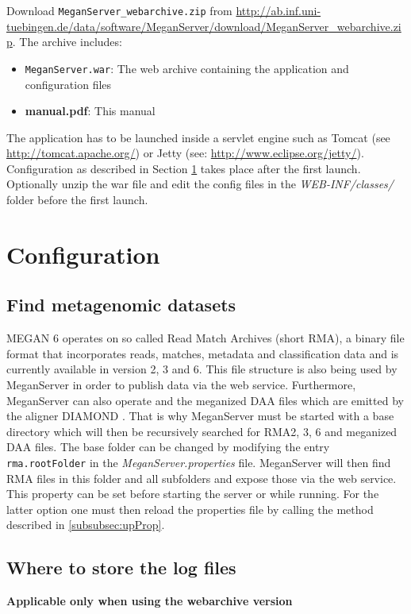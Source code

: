\documentclass[11pt]{article}
\begin{document}
Download \texttt{MeganServer\_webarchive.zip} from \url{http://ab.inf.uni-tuebingen.de/data/software/MeganServer/download/MeganServer\_webarchive.zip}. The archive includes:

\begin{itemize}
\item \texttt{MeganServer.war}: The web archive containing the application and configuration files
\item \textbf{manual.pdf}: This manual
\end{itemize}


The application has to be launched inside a servlet engine such as Tomcat (see \url{http://tomcat.apache.org/}) or Jetty (see: \url{http://www.eclipse.org/jetty/}). Configuration as described in Section \ref{sec:config} takes place after the first launch. Optionally unzip the war file and edit the config files in the \textit{WEB-INF/classes/} folder before the first launch.

\section{Configuration}
\label{sec:config}

\subsection{Find metagenomic datasets}
\label{subsec:props}

MEGAN 6 operates on so called Read Match Archives (short RMA), a binary file format that incorporates reads, matches, metadata and classification data and is currently available in version 2, 3 and 6. This file structure is also being used by MeganServer in order to publish data via the web service. Furthermore, MeganServer can also operate and the meganized DAA files which are emitted by the aligner DIAMOND \cite{DIAMOND}. That is why MeganServer must be started with a base directory which will then be recursively searched for RMA2, 3, 6 and meganized DAA files.
The base folder can be changed by modifying the entry \texttt{rma.rootFolder} in the \textit{MeganServer.properties} file. MeganServer will then find RMA files in this folder and all subfolders and expose those via the web service. This property can be set before starting the server or while running. For the latter option one must then reload the properties file by calling the method described in \ref{subsubsec:upProp}.


\subsection{Where to store the log files}
\textbf{Applicable only when using the webarchive version}
\end{document}
